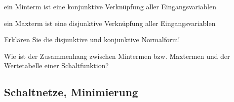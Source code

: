 \documentclass
[
  draft    = true,
  fontsize = 11pt,
  parskip  = half-,
  BCOR     = 0pt,
  DIV      = 11,
  ngerman,
  dvipsnames
]
{scrartcl}
\begin{document}
\begin{mytemize}
\begin{achim}
          \begin{mytemize}
            \item ein Minterm ist eine konjunktive Verknüpfung aller Eingangsvariablen
            \item ein Maxterm ist eine disjunktive Verknüpfung aller Eingangsvariablen
          \end{mytemize}
        \end{achim}
  \item Erklären Sie die disjunktive und konjunktive Normalform!
  \item Wie ist der Zusammenhang zwischen Mintermen bzw. Maxtermen und der Wertetabelle einer Schaltfunktion?
\end{mytemize}

\subsection*{Schaltnetze, Minimierung}
\end{document}
